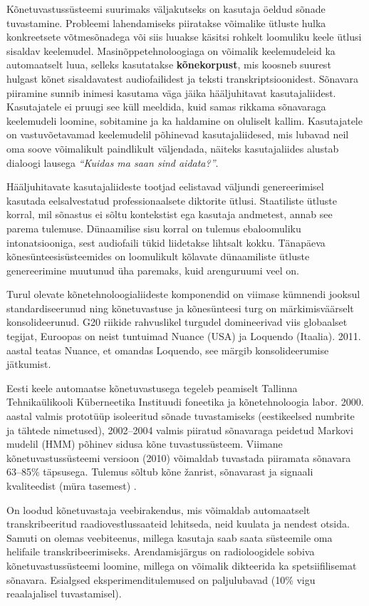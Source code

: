 \begin{multicols}{2}
Kõnetuvastussüsteemi suurimaks väljakutseks on kasutaja öeldud sõnade tuvastamine.  Probleemi lahendamiseks piiratakse võimalike ütluste hulka konkreetsete võtmesõnadega või siis luuakse käsitsi rohkelt loomuliku keele ütlusi sisaldav keelemudel.  Masinõppetehnoloogiaga on võimalik keelemudeleid ka automaatselt luua, selleks kasutatakse \textbf{kõnekorpust}, mis koosneb suurest hulgast kõnet sisaldavatest audiofailidest ja teksti transkriptsioonidest.  Sõnavara piiramine sunnib inimesi kasutama väga jäika hääljuhitavat kasutajaliidest.  Kasutajatele ei pruugi see küll meeldida, kuid samas rikkama sõnavaraga keelemudeli loomine, sobitamine ja ka haldamine on oluliselt kallim.  Kasutajatele on vastuvõetavamad keelemudelil põhinevad kasutajaliidesed, mis lubavad neil oma soove võimalikult paindlikult väljendada, näiteks kasutajaliides alustab dialoogi lausega \textit{``Kuidas ma saan sind aidata?''}.

Hääljuhitavate kasutajaliideste tootjad eelistavad väljundi genereerimisel kasutada eelsalvestatud professionaalsete diktorite ütlusi.  Staatiliste ütluste korral, mil sõnastus ei sõltu kontekstist ega kasutaja andmetest, annab see parema tulemuse.  Dünaamilise sisu korral on tulemus ebaloomuliku intonatsiooniga, sest audiofaili tükid liidetakse lihtsalt kokku.  Tänapäeva kõnesünteesisüsteemides on loomulikult kõlavate dünaamiliste ütluste genereerimine muutunud üha paremaks, kuid arenguruumi veel on.

Turul olevate kõnetehnoloogialiideste komponendid on viimase kümnendi jooksul standardiseerunud ning kõnetuvastuse ja kõnesünteesi turg on märkimisväärselt konsolideerunud.  G20 riikide rahvuslikel turgudel domineerivad viis globaalset tegijat, Euroopas on neist tuntuimad Nuance (USA) ja Loquendo (Itaalia).  2011. aastal teatas Nuance, et omandas Loquendo, see märgib konsolideerumise jätkumist.

Eesti keele automaatse kõnetuvastusega tegeleb peamiselt Tallinna Tehnikaülikooli Küberneetika Instituudi foneetika ja kõnetehnoloogia labor.  2000. aastal valmis prototüüp isoleeritud sõnade tuvastamiseks (eestikeelsed numbrite ja tähtede nimetused), 2002--2004 valmis piiratud sõnavaraga peidetud Markovi mudelil (HMM) põhinev sidusa kõne tuvastussüsteem.  Viimane kõnetuvastussüsteemi versioon (2010) võimaldab tuvastada piiramata sõnavara 63--85\% täpsusega. Tulemus sõltub kõne žanrist, sõnavarast ja signaali kvaliteedist (müra tasemest) \cite{Phon}.

On loodud kõnetuvastaja veebirakendus, mis võimaldab automaatselt transkribeeritud raadiovestlussaateid lehitseda, neid kuulata ja nendest otsida. Samuti on olemas veebiteenus, millega kasutaja saab saata süsteemile oma helifaile transkribeerimiseks. Arendamisjärgus on radioloogidele sobiva kõnetuvastussüsteemi loomine, millega on võimalik dikteerida ka spetsiifilisemat sõnavara. Esialgsed eksperimenditulemused on paljulubavad (10\% vigu reaalajalisel tuvastamisel).


\end{multicols}
